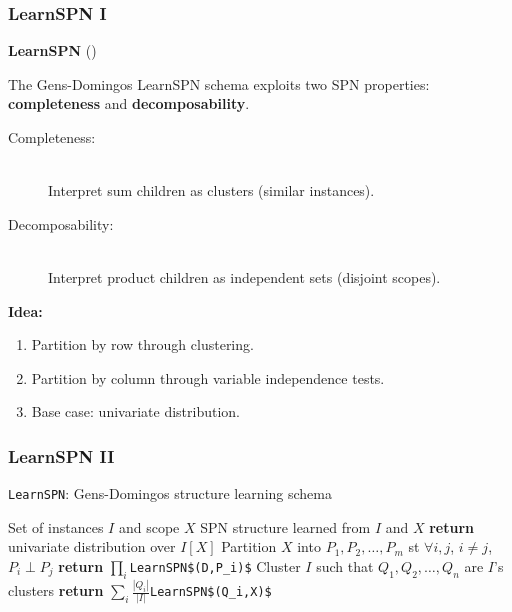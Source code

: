 \documentclass[usenames,dvipsnames]{beamer}
\newcommand{\indep}{\perp}
\newcommand{\code}[1]{\lstinline[mathescape=true]{#1}}
\newcommand{\mcode}[1]{\lstinline[mathescape]!#1!}
\begin{document}
\begin{frame}
  \frametitle{LearnSPN I}
  {\large\textbf{LearnSPN} (\cite{gens-domingos})}

  The Gens-Domingos LearnSPN schema exploits two SPN properties:
  {\color{blue}\textbf{completeness}} and {\color{red}\textbf{decomposability}}.

  \begin{description}
    \item[\color{blue}Completeness:]~\\
      Interpret sum children as clusters (similar instances).
    \item[\color{red}Decomposability:]~\\
      Interpret product children as independent sets (disjoint scopes).
  \end{description}

  \textbf{Idea:}
  \begin{enumerate}
    \item {\color{blue}Partition by row through clustering.}
    \item {\color{red}Partition by column through variable independence tests.}
    \item Base case: univariate distribution.
  \end{enumerate}
\end{frame}

\begin{frame}
  \frametitle{LearnSPN II}

  \begin{algorithm}[H]
    \caption{\code{LearnSPN}: Gens-Domingos structure learning schema}
    \begin{algorithmic}[1]
      \Require Set of instances $I$ and scope $X$
      \Ensure SPN structure learned from $I$ and $X$
        \State \textbf{return} univariate distribution over $I[X]$
      \EndIf%
      \State Partition $X$ into $P_1,P_2,\ldots,P_m$ st $\forall i, j$, $i\neq j$, $P_i\indep P_j$
        \State \textbf{return} $\prod_i$\mcode{LearnSPN$(D,P_i)$}
      \EndIf%
      \State Cluster $I$ such that $Q_1,Q_2,\ldots,Q_n$ are $I$'s clusters
      \State \textbf{return} $\sum_i\frac{|Q_i|}{|I|}$\mcode{LearnSPN$(Q_i,X)$}
    \end{algorithmic}
  \end{algorithm}

\end{frame}
\end{document}
